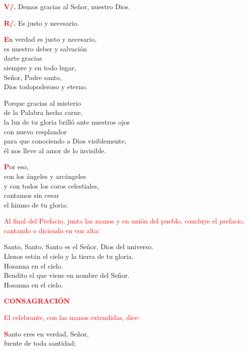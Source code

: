 \documentclass[12pt, letterpaper]{report}
\begin{document}
\noindent
\Large {\bfseries \textcolor{red}{V/.}} \hspace{0.5cm} Demos gracias al Se\~nor, nuestro Dios.

\noindent
\Large {\bfseries \textcolor{red}{R/.}} \hspace{0.5cm} Es justo y necesario.

\lettrine[lines=1]{\bfseries \textcolor{red}{E}}{}\Large n verdad es justo y necesario,\\
    es nuestro deber y salvaci\'on\\
    darte gracias\\
    siempre y en todo lugar,\\
    Se\~nor, Padre santo,\\
    Dios todopoderoso y eterno.

\noindent
\Large Porque gracias al misterio\\
    de la Palabra hecha carne,\\
    la luz de tu gloria brill\'o ante nuestros ojos\\
    con nuevo resplandor\\
    para que conociendo a Dios visiblemente,\\
    \'el nos lleve al amor de lo invisible.

\lettrine[lines=1]{\bfseries \textcolor{red}{P}}{}\Large or eso,\\
    con los \'angeles y arc\'angeles\\
    y con todos los coros celestiales,\\
    cantamos sin cesar\\
    el himno de tu gloria:
    
\large{\textcolor{red}{Al final del Prefacio, junta las manos y en uni\'on del pueblo, concluye el prefacio, cantando o diciendo en voz alta:}}

\newpage

\noindent
\Large {Santo, Santo, Santo es el Se\~nor, Dios del universo.\\
Llenos est\'an el cielo y la tierra de tu gloria.\\
Hosanna en el cielo.\\
Bendito el que viene en nombre del Se\~nor.\\
Hosanna en el cielo.}

\Large {\bfseries \textcolor{red}{CONSAGRACI\'ON}} 

\large{\textcolor{red}{El celebrante, con las manos extendidas, dice:}}

\lettrine[lines=1]{\bfseries \textcolor{red}{S}}{}\Large anto eres en verdad, Se\~nor,\\
fuente de toda santidad;
\end{document}

